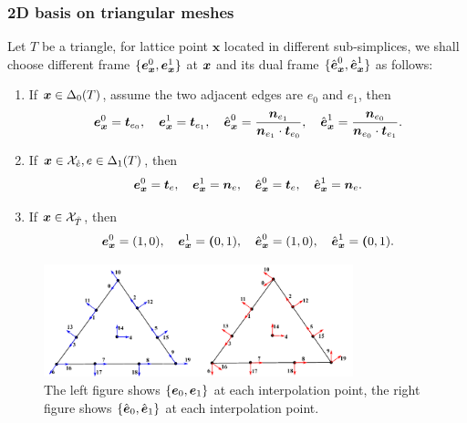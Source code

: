 \documentclass[mathpazo]{cicp}
\begin{document}
\subsubsection{2D basis on triangular meshes}
Let $T$ be a triangle, for lattice point $\boldsymbol{x}$ located in different sub-simplices, %
we shall choose different frame $\{\boldsymbol e_{\boldsymbol x}^0, \boldsymbol e_{\boldsymbol x}^1\}$ 
at $\boldsymbol x$ and its dual frame 
$\{\hat {\boldsymbol e}_{\boldsymbol x}^0, \hat{\boldsymbol e}_{\boldsymbol x}^1\}$ 
as follows:
\begin{enumerate}
  \item If $\boldsymbol x \in \Delta_0(T)$, assume the two adjacent edges are $e_0$ 
    and $e_1$, then
  $$
  \boldsymbol e_{\boldsymbol x}^0 = \boldsymbol t_{e_0}, \quad 
  \boldsymbol e_{\boldsymbol x}^1 = \boldsymbol t_{e_1}, \quad
  \hat{\boldsymbol e}_{\boldsymbol x}^0 = \frac{\boldsymbol n_{e_1}}{\boldsymbol n_{e_1} 
  \cdot \boldsymbol t_{e_0}},
   \quad 
  \hat{\boldsymbol e}_{\boldsymbol x}^1 = \frac{\boldsymbol n_{e_0}}{\boldsymbol n_{e_0} 
  \cdot \boldsymbol t_{e_1}}.
  $$
  \item If $\boldsymbol x \in \mathcal X_{\mathring{e}}, e \in \Delta_1(T)$, 
    then
  $$
  \boldsymbol e_{\boldsymbol x}^0 = \boldsymbol t_{e}, \quad \boldsymbol e_{\boldsymbol x}^1 = \boldsymbol n_{e}, \quad	
  \hat{\boldsymbol e}_{\boldsymbol x}^0 = \boldsymbol t_{e}, \quad \hat{\boldsymbol e}_{\boldsymbol x}^1 = \boldsymbol n_{e}.	
  $$  
  \item If $\boldsymbol x \in \mathcal X_{\mathring{T}}$, then
  $$
  \boldsymbol e_{\boldsymbol x}^0 = (1, 0), \quad \boldsymbol e_{\boldsymbol x}^1 = \boldsymbol (0, 1), \quad
  \hat{\boldsymbol e}_{\boldsymbol x}^0 = (1, 0), \quad \hat{\boldsymbol e}_{\boldsymbol x}^1 = \boldsymbol (0, 1).
  $$		
\end{enumerate}

\begin{figure}[htp]
\centering
\includegraphics[width=0.8\textwidth]{figures/nedelec.pdf}
\caption{The left figure shows $\{\boldsymbol e_0, \boldsymbol e_1\}$ at each interpolation 
point, the right figure shows $\{\hat{ \boldsymbol e}_0, \hat{ \boldsymbol e}_1\}$ 
at each interpolation point.}
\end{figure}
\end{document}
